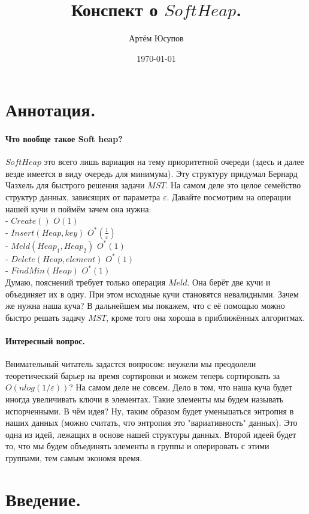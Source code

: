 \documentclass{article}
\title{Конспект о $SoftHeap$.}
\author{Артём Юсупов}
\date{\today}
\begin{document}
	\maketitle
	\section{Аннотация.}
		\paragraph{Что вообще такое Soft heap?}
		$SoftHeap$ это всего лишь вариация на тему приоритетной очереди (здесь и далее везде имеется в виду очередь для минимума). Эту структуру придумал Бернард Чазхель для быстрого решения задачи $MST$. На самом деле это целое семейство структур данных, зависящих от параметра $\varepsilon$. Давайте посмотрим на операции нашей кучи и поймём зачем она нужна:\\
		- $Create()$ $O(1)$\\
		- $Insert(Heap, key)$ $O^{*}(\frac{1}{\varepsilon})$\\
		- $Meld(Heap_1, Heap_2)$ $O^{*}(1)$\\
		- $Delete(Heap, element)$ $O^{*}(1)$\\
		- $FindMin(Heap)$ $O^{*}(1)$\\
		Думаю, пояснений требует только  операция $Meld$. Она берёт две кучи и объединяет их в  одну. При этом исходные кучи становятся невалидными. Зачем же нужна наша куча? В дальнейшем мы покажем, что с её помощью можно быстро решать задачу $MST$, кроме того она хороша в приближённых алгоритмах.
		\paragraph{Интересный вопрос.} Внимательный читатель задастся вопросом: неужели мы преодолели теоретический барьер на время сортировки и можем теперь сортировать за $O(nlog(1/\varepsilon))$?
		На самом деле не совсем. Дело в том, что наша куча будет иногда увеличивать ключи в элементах. Такие элементы мы будем называть испорченными. В чём идея? Ну, таким образом будет уменьшаться энтропия в наших данных (можно считать, что энтропия это "вариативность" данных). Это одна из идей, лежащих в основе нашей структуры данных. Второй идеей будет то, что мы будем объединять элементы в группы и оперировать с этими группами, тем самым экономя время.
	\section{Введение.}
\end{document}
